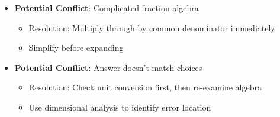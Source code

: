 \documentclass[11pt]{article}
\begin{document}
\begin{conversionbox}
\begin{itemize}[leftmargin=*]
    \item \textbf{Potential Conflict}: Complicated fraction algebra
    \begin{itemize}[leftmargin=*]
        \item Resolution: Multiply through by common denominator immediately
        \item Simplify before expanding
    \end{itemize}
    
    \item \textbf{Potential Conflict}: Answer doesn't match choices
    \begin{itemize}[leftmargin=*]
        \item Resolution: Check unit conversion first, then re-examine algebra
        \item Use dimensional analysis to identify error location
    \end{itemize}
\end{itemize}
\end{conversionbox}
\end{document}
